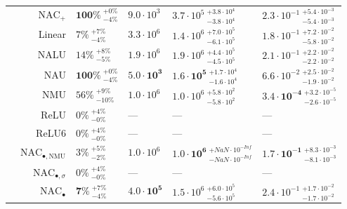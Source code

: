 \begin{longtable}{crllll}
\nopagebreak
 & $\mathrm{NAC}_{+}$ & $\mathbf{100\%} {~}^{+0\%}_{-4\%}$ & $9.0 \cdot 10^{3}$ & $3.7 \cdot 10^{5} {~}^{+3.8 \cdot 10^{4}}_{-3.8 \cdot 10^{4}}$ & $2.3 \cdot 10^{-1} {~}^{+5.4 \cdot 10^{-3}}_{-5.4 \cdot 10^{-3}}$\\

\nopagebreak
 & Linear & $7\% {~}^{+7\%}_{-4\%}$ & $3.3 \cdot 10^{6}$ & $1.4 \cdot 10^{6} {~}^{+7.0 \cdot 10^{5}}_{-6.1 \cdot 10^{5}}$ & $1.8 \cdot 10^{-1} {~}^{+7.2 \cdot 10^{-2}}_{-5.8 \cdot 10^{-2}}$\\

\nopagebreak
 & NALU & $14\% {~}^{+8\%}_{-5\%}$ & $1.9 \cdot 10^{6}$ & $1.9 \cdot 10^{6} {~}^{+4.4 \cdot 10^{5}}_{-4.5 \cdot 10^{5}}$ & $2.1 \cdot 10^{-1} {~}^{+2.2 \cdot 10^{-2}}_{-2.2 \cdot 10^{-2}}$\\

\nopagebreak
 & NAU & $\mathbf{100\%} {~}^{+0\%}_{-4\%}$ & $\mathbf{5.0 \cdot 10^{3}}$ & $\mathbf{1.6 \cdot 10^{5}} {~}^{+1.7 \cdot 10^{4}}_{-1.6 \cdot 10^{4}}$ & $6.6 \cdot 10^{-2} {~}^{+2.5 \cdot 10^{-2}}_{-1.9 \cdot 10^{-2}}$\\

\nopagebreak
 & NMU & $56\% {~}^{+9\%}_{-10\%}$ & $1.0 \cdot 10^{6}$ & $1.0 \cdot 10^{6} {~}^{+5.8 \cdot 10^{2}}_{-5.8 \cdot 10^{2}}$ & $\mathbf{3.4 \cdot 10^{-4}} {~}^{+3.2 \cdot 10^{-5}}_{-2.6 \cdot 10^{-5}}$\\

\nopagebreak
 & ReLU & $0\% {~}^{+4\%}_{-0\%}$ & --- & --- & ---\\

\nopagebreak
\multirow{-10}{*}{\centering\arraybackslash $\bm{-}$} & ReLU6 & $0\% {~}^{+4\%}_{-0\%}$ & --- & --- & ---\\
\cmidrule{1-6}
 & $\mathrm{NAC}_{\bullet,\mathrm{NMU}}$ & $3\% {~}^{+5\%}_{-2\%}$ & $1.0 \cdot 10^{6}$ & $\mathbf{1.0 \cdot 10^{6}} {~}^{+NaN \cdot 10^{-Inf}}_{-NaN \cdot 10^{-Inf}}$ & $\mathbf{1.7 \cdot 10^{-1}} {~}^{+8.3 \cdot 10^{-3}}_{-8.1 \cdot 10^{-3}}$\\

\nopagebreak
 & $\mathrm{NAC}_{\bullet,\sigma}$ & $0\% {~}^{+4\%}_{-0\%}$ & --- & --- & ---\\

\nopagebreak
 & $\mathrm{NAC}_{\bullet}$ & $\mathbf{7\%} {~}^{+7\%}_{-4\%}$ & $\mathbf{4.0 \cdot 10^{5}}$ & $1.5 \cdot 10^{6} {~}^{+6.0 \cdot 10^{5}}_{-5.6 \cdot 10^{5}}$ & $2.4 \cdot 10^{-1} {~}^{+1.7 \cdot 10^{-2}}_{-1.7 \cdot 10^{-2}}$\\


\end{longtable}
